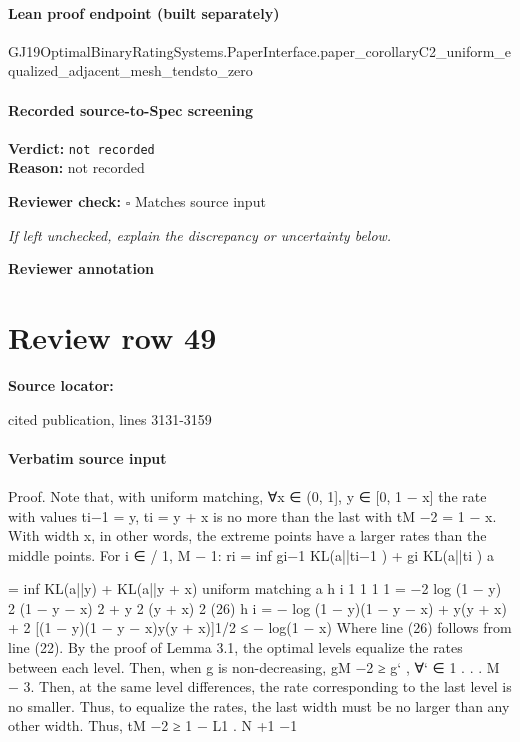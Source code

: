 \documentclass[10pt]{article}
\newcommand{\reviewerbox}{%
  \par\noindent\fbox{\parbox{0.96\linewidth}{\rule{0pt}{0.38in}}}\par
}
\newcommand{\reviewmatch}[1]{%
  \par\noindent\textbf{Reviewer check:} $\square$\; #1\par
  \noindent\emph{If left unchecked, explain the discrepancy or uncertainty below.}\par
}
\begin{document}
\paragraph{Lean proof endpoint (built separately)}\begin{ReviewVerbatim}
GJ19OptimalBinaryRatingSystems.PaperInterface.paper_corollaryC2_uniform_equalized_adjacent_mesh_tendsto_zero
\end{ReviewVerbatim}

\paragraph{Recorded source-to-Spec screening}
\textbf{Verdict:} \texttt{not recorded}
\\
\textbf{Reason:} not recorded
\reviewmatch{Matches source input}
\noindent\textbf{Reviewer annotation}\par
\reviewerbox
\clearpage
\hypertarget{source-claim-6e85310ac4deebe8}{}
\section*{Review row 49}
\textbf{Source locator:} {\footnotesize\raggedright cited publication, lines 3131-\allowbreak{}3159\par}
\paragraph{Verbatim source input}
\begin{ReviewVerbatim}
Proof. Note that, with uniform matching, ∀x ∈ (0, 1], y ∈ [0, 1 − x] the rate with values ti−1 =
y, ti = y + x is no more than the last with tM −2 = 1 − x. With width x, in other words, the extreme
points have a larger rates than the middle points. For i ∈
/ {1, M − 1}:
ri = inf {gi−1 KL(a||ti−1 ) + gi KL(a||ti )}
a

= inf {KL(a||y) + KL(a||y + x)}
uniform matching
a
h
i
1
1
1
1
= −2 log (1 − y) 2 (1 − y − x) 2 + y 2 (y + x) 2
(26)
h
i
= − log (1 − y)(1 − y − x) + y(y + x) + 2 [(1 − y)(1 − y − x)y(y + x)]1/2
≤ − log(1 − x)
Where line (26) follows from line (22).
By the proof of Lemma 3.1, the optimal levels equalize the rates between each level. Then,
when g is non-decreasing, gM −2 ≥ g` , ∀` ∈ {1 . . . M − 3}. Then, at the same level differences, the
rate corresponding to the last level is no smaller. Thus, to equalize the rates, the last width must
be no larger than any other width. Thus, tM −2 ≥ 1 − L1 .
N +1 −1
\end{ReviewVerbatim}
\end{document}
